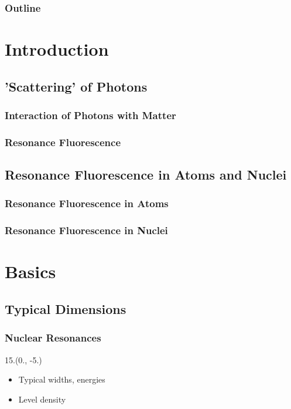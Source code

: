 \documentclass{beamer}
\begin{document}
\begin{frame}
    \titlepage
\end{frame}

\begin{frame}
    \frametitle{Outline}
    \tableofcontents
\end{frame}

\section{Introduction}

\subsection{'Scattering' of Photons}

\begin{frame}
    \frametitle{Interaction of Photons with Matter}
\end{frame}

\begin{frame}
    \frametitle{Resonance Fluorescence}
    
\end{frame}

\subsection{Resonance Fluorescence in Atoms and Nuclei}

\begin{frame}
    \frametitle{Resonance Fluorescence in Atoms}
\end{frame}

\begin{frame}
    \frametitle{Resonance Fluorescence in Nuclei}
\end{frame}

\section{Basics}

\subsection{Typical Dimensions}

\begin{frame}
    \frametitle{Nuclear Resonances}
    \begin{textblock}{15.}(0., -5.)
        \begin{itemize}
            \item Typical widths, energies
            \item Level density
        \end{itemize}
    \end{textblock}
\end{frame}
\end{document}
